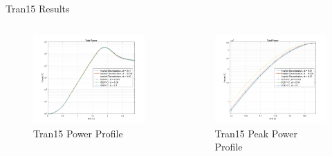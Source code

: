 \documentclass[8pt,xcolor=dvipnames]{beamer}
\begin{document}
\begin{frame}{Tran15 Results}

\begin{columns}

\begin{figure}
\includegraphics[width=\linewidth]{figures/Tran15_1.png}
\caption{Tran15 Power Profile}
\end{figure}

\begin{figure}
\includegraphics[width=\linewidth]{figures/Tran15_2.png}
\caption{Tran15 Peak Power Profile}
\end{figure}

\end{columns}

\end{frame}
\end{document}
